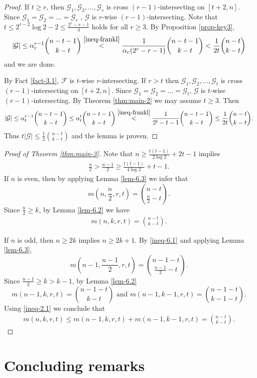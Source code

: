 \documentclass[11pt,a4paper]{article}
\newtheorem{false statement}{False statement}
\theoremstyle{definition}
\def\hf{\mathcal{F}}
\def\hg{\mathcal{G}}
\begin{document}
\begin{proof}
If $t\geq r$, then $\hg_1,\hg_2,\ldots,\hg_r$ is cross $(r-1)$-intersecting on $[t+2,n]$. Since $\hg_1=\hg_2=\ldots=\hg_r$ , $\hg$ is $r$-wise $(r-1)$-intersecting. Note that  $t\leq 2^{r-2}\log 2 -2\leq \frac{2^r-r-1}{4}$ holds for all $r\geq 3$. By Proposition \ref{prop-key3},
\[
|\hg| \leq \alpha_r^{r-1}\binom{n-t-1}{k-t} \overset{\eqref{ineq-frankl}}{<}\frac{1}{\alpha_r(2^r-r-1)}\binom{n-t-1}{k-t} <\frac{1}{2t} \binom{n-t}{k-t}
\]
and we are done.

By Fact \ref{fact-3.1},  $\hf$ is $t$-wise $r$-intersecting. 
If $r>t$ then $\hg_1,\hg_2,\ldots,\hg_t$ is cross $(r-1)$-intersecting on $[t+2,n]$. Since $\hg_1=\hg_2=\ldots=\hg_t$,    $\hg$ is $t$-wise $(r-1)$-intersecting. By Theorem \ref{thm:main-2} we may assume $t\geq 3$. Then
\[
|\hg| \leq \alpha_t^{r-1}\binom{n-t-1}{k-t} \leq \alpha_t^{t}\binom{n-t-1}{k-t} \overset{\eqref{ineq-frankl}}{<}\frac{1}{2^t-t-1}\binom{n-t-1}{k-t}\leq  \frac{1}{2t} \binom{n-t}{k-t}.
\]
Thus $t|\hg|\leq \frac{1}{2}\binom{n-t}{k-t}$ and the lemma is proven.
\end{proof}



\begin{proof}[Proof of Theorem \ref{thm:main-3}]
Note that $n\geq \frac{t(t-1)}{2\log 2} +2t-1$ implies
\begin{align}\label{ineq-6.1}
\frac{n}{2}>\frac{n-1}{2}\geq \frac{t(t-1)}{4\log 2} +t-1.
\end{align}
If $n$ is even, then by applying Lemma \ref{lem-6.3} we infer that
\[
m\left(n,\frac{n}{2},r,t\right) =\binom{n-t}{\frac{n}{2}-t}.
\]
Since $\frac{n}{2}\geq k$, by Lemma \ref{lem-6.2} we have
\begin{align*}
m\left(n,k,r,t\right) =\binom{n-t}{k-t}.
\end{align*}

If $n$ is odd, then $n\geq 2k$ implies $n\geq 2k+1$. By \eqref{ineq-6.1} and applying Lemma \ref{lem-6.3},
\[
m\left(n-1,\frac{n-1}{2},r,t\right) =\binom{n-1-t}{\frac{n-1}{2}-t}.
\]
Since $\frac{n-1}{2}\geq k>k-1$, by Lemma \ref{lem-6.2}
\[
m(n-1,k,r,t) = \binom{n-1-t}{k-t}\mbox{ and }m(n-1,k-1,r,t) = \binom{n-1-t}{k-1-t}.
\]
Using \eqref{ineq-2.1} we conclude that
\begin{align*}
m(n,k,r,t) \leq m(n-1,k,r,t) +m(n-1,k-1,r,t)  =\binom{n-t}{k-t}.
\end{align*}
\end{proof}

\section{Concluding remarks}
\end{document}
